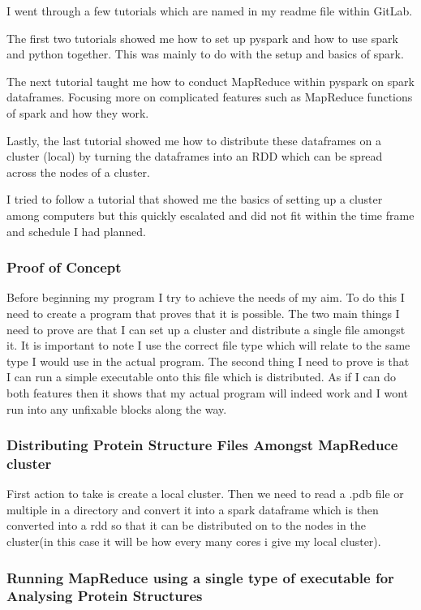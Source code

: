 \documentclass{report}
\begin{document}
I went through a few tutorials which are named in my readme file within GitLab.

The first two tutorials showed me how to set up pyspark and how to use spark and python together. This was mainly to do with the setup and basics of spark.

The next tutorial taught me how to conduct MapReduce within pyspark on spark dataframes. Focusing more on complicated features such as MapReduce functions of spark and how they work.

Lastly, the last tutorial showed me how to distribute these dataframes on a cluster (local) by turning the dataframes into an RDD which can be spread across the nodes of a cluster.

 I tried to follow a tutorial that showed me the basics of setting up a cluster among computers but this quickly escalated and did not fit within the time frame and schedule I had planned.

\subsubsection{Proof of Concept}

Before beginning my program I try to achieve the needs of my aim. To do this I need to create a program that proves that it is possible. The two main things I need to prove are that I can set up a cluster and distribute a single file amongst it. It is important to note I use the correct file type which will relate to the same type I would use in the actual program. The second thing I need to prove is that I can run a simple executable onto this file which is distributed. As if I can do both features then it shows that my actual program will indeed work and I wont run into any unfixable blocks along the way.

\subsubsection{Distributing Protein Structure Files Amongst MapReduce cluster}

First action to take is create a local cluster. Then we need to read a .pdb file or multiple in a directory and convert it into a spark dataframe which is then converted into a rdd so that it can be distributed on to the nodes in the cluster(in this case it will be how every many cores i give my local cluster).

\subsubsection{Running MapReduce using a single type of executable for Analysing Protein Structures}
\end{document}
